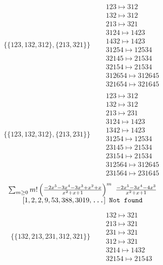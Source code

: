 \begin{tiny}
\begin{align}
\begin{matrix}
\end{matrix}
\\
\{\{123, 132, 312\}, \{213, 321\}\}
\quad
&
\begin{matrix}
123 \mapsto 312\\132 \mapsto 312\\213 \mapsto 321\\3124 \mapsto 1423\\1432 \mapsto 1423\\31254 \mapsto 12534\\32145 \mapsto 21534\\32154 \mapsto 21534\\312654 \mapsto 312645\\321654 \mapsto 321645
\end{matrix}
\\
\{\{123, 132, 312\}, \{213, 231\}\}
\quad
&
\begin{matrix}
123 \mapsto 312\\132 \mapsto 312\\213 \mapsto 231\\3124 \mapsto 1423\\1342 \mapsto 1423\\31254 \mapsto 12534\\23145 \mapsto 21534\\23154 \mapsto 21534\\312564 \mapsto 312645\\231564 \mapsto 231645
\end{matrix}
\end{align}
$$
\begin{matrix}
\sum_{m \geq 0} m! \left(
\frac{-2 x^{5} - 3 x^{4} - 3 x^{3} + x^{2} + x}{x^{2} + x + 1}
\right)^m
\ 
\frac{-2 x^{5} - 3 x^{4} - 4 x^{3}}{x^{2} + x + 1}
\\
\left[1, 2, 2, 9, 53, 388, 3019, \text{\texttt{...}}\right]
\ 
\texttt{Not found}
\end{matrix}
$$
\vspace{-1em}
\begin{align}
\{\{132, 213, 231, 312, 321\}\}
\quad
&
\begin{matrix}
132 \mapsto 321\\213 \mapsto 321\\231 \mapsto 321\\312 \mapsto 321\\3214 \mapsto 1432\\32154 \mapsto 21543
\end{matrix}
\\

\end{align}
\end{tiny}
